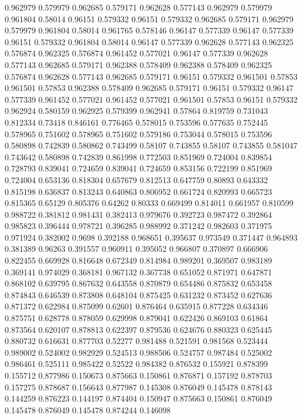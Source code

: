 0.962979 0.579979
0.962685 0.579171
0.962628 0.577143
0.962979 0.579979
0.961804 0.58014
0.96151 0.579332
0.96151 0.579332
0.962685 0.579171
0.962979 0.579979
0.961804 0.58014
0.961765 0.578146
0.96147 0.577339
0.96147 0.577339
0.96151 0.579332
0.961804 0.58014
0.96147 0.577339
0.962628 0.577143
0.962325 0.576874
0.962325 0.576874
0.961452 0.577021
0.96147 0.577339
0.962628 0.577143
0.962685 0.579171
0.962388 0.578409
0.962388 0.578409
0.962325 0.576874
0.962628 0.577143
0.962685 0.579171
0.96151 0.579332
0.961501 0.57853
0.961501 0.57853
0.962388 0.578409
0.962685 0.579171
0.96151 0.579332
0.96147 0.577339
0.961452 0.577021
0.961452 0.577021
0.961501 0.57853
0.96151 0.579332
0.962924 0.580159
0.962925 0.579399
0.962941 0.57864
0.819759 0.731043
0.812334 0.73418
0.846161 0.776465
0.578015 0.753596
0.577635 0.752445
0.578965 0.751602
0.578965 0.751602
0.579186 0.753044
0.578015 0.753596
0.580898 0.742839
0.580862 0.743499
0.58107 0.743855
0.58107 0.743855
0.581047 0.743642
0.580898 0.742839
0.861998 0.772503
0.851969 0.724004
0.839854 0.728793
0.839041 0.724659
0.839041 0.724659
0.853156 0.722199
0.851969 0.724004
0.653136 0.818304
0.657679 0.812513
0.647759 0.80893
0.643332 0.815198
0.636837 0.813243
0.640863 0.806952
0.661724 0.820993
0.665723 0.815365
0.65129 0.805376
0.64262 0.80333
0.669499 0.814011
0.661957 0.810599
0.988722 0.381812
0.981431 0.382413
0.979676 0.392723
0.987472 0.392864
0.985823 0.396444
0.978721 0.396285
0.988992 0.371242
0.982603 0.371975
0.971924 0.382002
0.9698 0.392188
0.968651 0.395637
0.973549 0.371447
0.964893 0.381389
0.96263 0.391557
0.960911 0.395052
0.966807 0.370897
0.666906 0.822455
0.669928 0.816648
0.672349 0.814984
0.989201 0.369507
0.983189 0.369141
0.974029 0.368181
0.967132 0.367738
0.651052 0.871971
0.647871 0.868102
0.639795 0.867632
0.643558 0.870879
0.654486 0.875832
0.653458 0.874843
0.646539 0.873808
0.648104 0.875425
0.631232 0.873452
0.627636 0.871372
0.622984 0.875099
0.62601 0.876464
0.635915 0.877228
0.634346 0.875751
0.628778 0.878059
0.629998 0.879041
0.622426 0.869103
0.61864 0.873564
0.620107 0.878813
0.622397 0.879536
0.624676 0.880323
0.625445 0.880732
0.616631 0.877703
0.52277 0.981488
0.521591 0.981568
0.523444 0.989002
0.524002 0.982929
0.524513 0.988506
0.524757 0.987484
0.525002 0.986461
0.525111 0.985422
0.52522 0.984382
0.876532 0.155921
0.878399 0.155712
0.877986 0.150673
0.875663 0.150861
0.876871 0.157192
0.878703 0.157275
0.878687 0.156643
0.877987 0.145308
0.876049 0.145478
0.878143 0.144259
0.876223 0.144197
0.874404 0.150947
0.875663 0.150861
0.876049 0.145478
0.876049 0.145478
0.874244 0.146098
